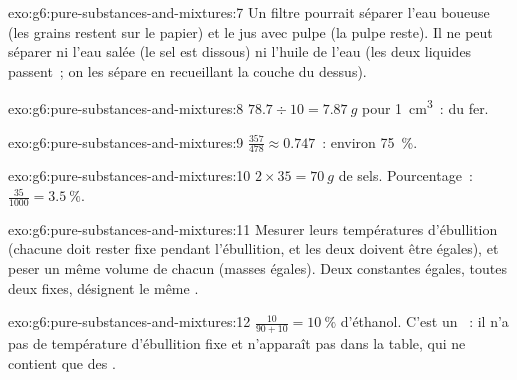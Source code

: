 \begin{solution}{exo:g6:pure-substances-and-mixtures:7}
Un filtre pourrait séparer l'eau boueuse (les grains restent sur le
papier) et le jus avec pulpe (la pulpe reste). Il ne peut séparer ni
l'eau salée (le sel est dissous) ni l'huile de l'eau (les deux liquides
passent~; on les sépare en recueillant la couche du dessus).
\end{solution}

\begin{solution}{exo:g6:pure-substances-and-mixtures:8}
$78.7 \div 10 = \qty{7.87}{g}$ pour \qty{1}{cm^3}~: du fer.
\end{solution}

\begin{solution}{exo:g6:pure-substances-and-mixtures:9}
$\frac{357}{478} \approx 0.747$~: environ \qty{75}{\percent}.
\end{solution}

\begin{solution}{exo:g6:pure-substances-and-mixtures:10}
$2 \times 35 = \qty{70}{g}$ de sels. Pourcentage~: $\frac{35}{1000} =
\qty{3.5}{\percent}$.
\end{solution}

\begin{solution}{exo:g6:pure-substances-and-mixtures:11}
Mesurer leurs températures d'ébullition (chacune doit rester fixe
pendant l'ébullition, et les deux doivent être égales), et peser un même
volume de chacun (masses égales). Deux constantes égales, toutes deux
fixes, désignent le même .
\end{solution}

\begin{solution}{exo:g6:pure-substances-and-mixtures:12}
$\frac{10}{90 + 10} = \qty{10}{\percent}$ d'éthanol. C'est un ~:
il n'a pas de température d'ébullition fixe et n'apparaît pas dans la
table, qui ne contient que des .
\end{solution}

